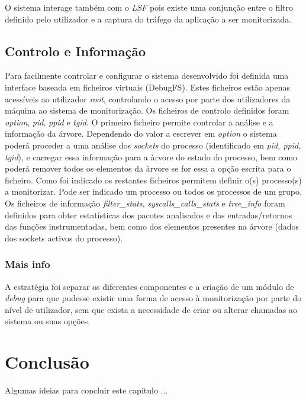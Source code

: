 O sistema interage também com o \textit{LSF} pois existe uma conjunção entre o filtro definido pelo utilizador e a captura do tráfego da aplicação a ser monitorizada.


\subsection{Controlo e Informação}
\label{sub:data_information}

Para facilmente controlar e configurar o sistema desenvolvido foi definida uma interface baseada em ficheiros virtuais (DebugFS).
 Estes ficheiros estão apenas acessíveis ao utilizador \textit{root}, controlando o acesso por parte dos utilizadores da máquina ao sistema de monitorização.
 Os ficheiros de controlo definidos foram \textit{option}, \textit{pid}, \textit{ppid} e \textit{tgid}.
 O primeiro ficheiro permite controlar a análise e a informação da árvore.
 Dependendo do valor a escrever em \textit{option} o sistema poderá proceder a uma análise dos \textit{sockets} do processo (identificado em \textit{pid, ppid, tgid}), e carregar essa informação para a àrvore do estado do processo, bem como poderá remover todos os elementos da àrvore se for essa a opção escrita para o ficheiro.
 Como foi indicado os restantes ficheiros permitem definir o(s) processo(s) a monitorizar.
 Pode ser indicado um processo ou todos os processos de um grupo.
 Os ficheiros de informação \textit{filter\_stats}, \textit{syscalls\_calls\_stats} e \textit{tree\_info} foram definidos para obter estatísticas dos pacotes analisados e das entradas/retornos das funções instrumentadas, bem como dos elementos presentes na árvore (dados dos sockets activos do processo).

\subsubsection{Mais info}
A estratégia foi separar os diferentes componentes e a criação de um módulo de \textit{debug} para que pudesse existir uma forma de acesso à monitorização por parte do nível de utilizador, sem que exista a necessidade de criar ou alterar chamadas ao sistema ou suas opções.



\section{Conclusão}

Algumas ideias para concluir este capitulo ...

